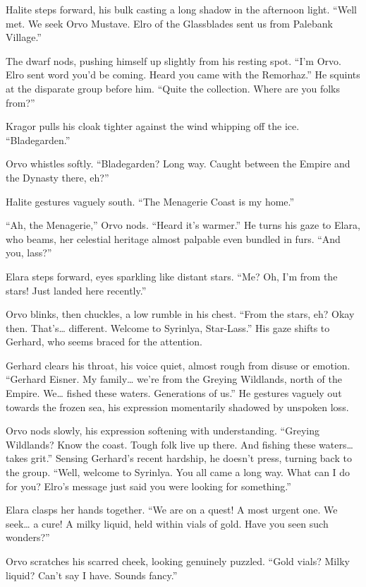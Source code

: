 \documentclass[
  letterpaper,12pt,twoside,twocolumn,openany,
  nodeprecatedcode,bg=full]{dndbook}
\begin{document}
Halite steps forward, his bulk casting a long shadow in the afternoon
light. ``Well met. We seek Orvo Mustave. Elro of the Glassblades sent us
from Palebank Village.''

The dwarf nods, pushing himself up slightly from his resting spot. ``I'm
Orvo. Elro sent word you'd be coming. Heard you came with the
Remorhaz.'' He squints at the disparate group before him. ``Quite the
collection. Where are you folks from?''

Kragor pulls his cloak tighter against the wind whipping off the ice.
``Bladegarden.''

Orvo whistles softly. ``Bladegarden? Long way. Caught between the Empire
and the Dynasty there, eh?''

Halite gestures vaguely south. ``The Menagerie Coast is my home.''

``Ah, the Menagerie,'' Orvo nods. ``Heard it's warmer.'' He turns his
gaze to Elara, who beams, her celestial heritage almost palpable even
bundled in furs. ``And you, lass?''

Elara steps forward, eyes sparkling like distant stars. ``Me? Oh, I'm
from the stars! Just landed here recently.''

Orvo blinks, then chuckles, a low rumble in his chest. ``From the stars,
eh? Okay then. That's\ldots{} different. Welcome to Syrinlya,
Star-Lass.'' His gaze shifts to Gerhard, who seems braced for the
attention.

Gerhard clears his throat, his voice quiet, almost rough from disuse or
emotion. ``Gerhard Eisner. My family\ldots{} we're from the Greying
Wildlands, north of the Empire. We\ldots{} fished these waters.
Generations of us.'' He gestures vaguely out towards the frozen sea, his
expression momentarily shadowed by unspoken loss.

Orvo nods slowly, his expression softening with understanding. ``Greying
Wildlands? Know the coast. Tough folk live up there. And fishing these
waters\ldots{} takes grit.'' Sensing Gerhard's recent hardship, he
doesn't press, turning back to the group. ``Well, welcome to Syrinlya.
You all came a long way. What can I do for you? Elro's message just said
you were looking for something.''

Elara clasps her hands together. ``We are on a quest! A most urgent one.
We seek\ldots{} a cure! A milky liquid, held within vials of gold. Have
you seen such wonders?''

Orvo scratches his scarred cheek, looking genuinely puzzled. ``Gold
vials? Milky liquid? Can't say I have. Sounds fancy.''
\end{document}
